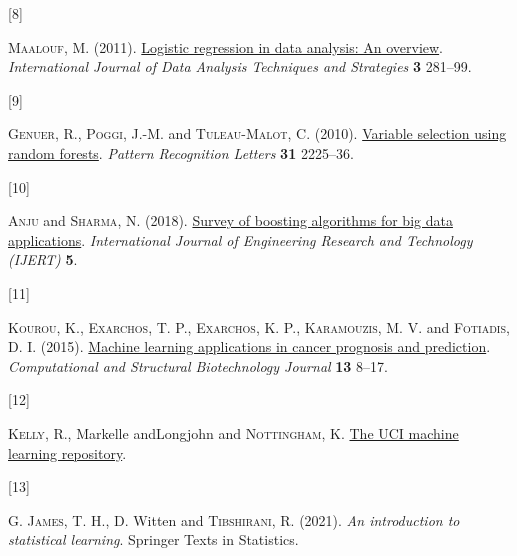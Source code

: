 \documentclass[
  letterpaper,
  DIV=11,
  numbers=noendperiod]{scrartcl}
\newlength{\cslhangindent}
\newlength{\csllabelwidth}
\newenvironment{CSLReferences}[2] %
 {\begin{list}{}{%
  \setlength{\itemindent}{0pt}
  \setlength{\leftmargin}{0pt}
  \setlength{\parsep}{0pt}
  \ifodd #1
   \setlength{\leftmargin}{\cslhangindent}
   \setlength{\itemindent}{-1\cslhangindent}
  \fi
  \setlength{\itemsep}{#2\baselineskip}}}
 {\end{list}}
\newcommand{\CSLLeftMargin}[1]{\parbox[t]{\csllabelwidth}{\strut#1\strut}}
\newcommand{\CSLRightInline}[1]{\parbox[t]{\linewidth - \csllabelwidth}{\strut#1\strut}}
\begin{document}
\begin{CSLReferences}{0}{1}
\CSLLeftMargin{{[}8{]} }%
\CSLRightInline{\textsc{Maalouf}, M. (2011).
\href{https://doi.org/10.1504/IJDATS.2011.041335}{Logistic regression in
data analysis: An overview}. \emph{International Journal of Data
Analysis Techniques and Strategies} \textbf{3} 281--99.}

\CSLLeftMargin{{[}9{]} }%
\CSLRightInline{\textsc{Genuer}, R., \textsc{Poggi}, J.-M. and
\textsc{Tuleau-Malot}, C. (2010).
\href{https://doi.org/10.1016/j.patrec.2010.03.014}{Variable selection
using random forests}. \emph{Pattern Recognition Letters} \textbf{31}
2225--36.}

\CSLLeftMargin{{[}10{]} }%
\CSLRightInline{\textsc{Anju} and \textsc{Sharma}, N. (2018).
\href{https://www.ijert.org/survey-of-boosting-algorithms-for-big-data-applications}{Survey
of boosting algorithms for big data applications}. \emph{International
Journal of Engineering Research and Technology (IJERT)} \textbf{5}.}

\CSLLeftMargin{{[}11{]} }%
\CSLRightInline{\textsc{Kourou}, K., \textsc{Exarchos}, T. P.,
\textsc{Exarchos}, K. P., \textsc{Karamouzis}, M. V. and
\textsc{Fotiadis}, D. I. (2015).
\href{https://doi.org/10.1016/j.csbj.2014.11.005}{Machine learning
applications in cancer prognosis and prediction}. \emph{Computational
and Structural Biotechnology Journal} \textbf{13} 8--17.}

\CSLLeftMargin{{[}12{]} }%
\CSLRightInline{\textsc{Kelly}, R., Markelle andLongjohn and
\textsc{Nottingham}, K. \href{https://archive.ics.uci.edu}{The UCI
machine learning repository}.}

\CSLLeftMargin{{[}13{]} }%
\CSLRightInline{\textsc{G. James}, T. H., D. Witten and
\textsc{Tibshirani}, R. (2021). \emph{An introduction to statistical
learning}. Springer Texts in Statistics.}

\end{CSLReferences}
\end{document}
